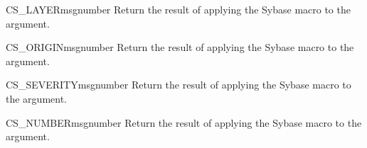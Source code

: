\begin{funcdesc}{CS_LAYER}{msgnumber}
Return the result of applying the Sybase  macro to the
 argument.
\end{funcdesc}

\begin{funcdesc}{CS_ORIGIN}{msgnumber}
Return the result of applying the Sybase  macro to the
 argument.
\end{funcdesc}

\begin{funcdesc}{CS_SEVERITY}{msgnumber}
Return the result of applying the Sybase  macro to the
 argument.
\end{funcdesc}

\begin{funcdesc}{CS_NUMBER}{msgnumber}
Return the result of applying the Sybase  macro to the
 argument.
\end{funcdesc}










